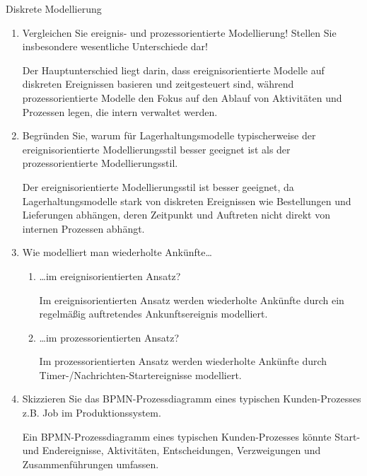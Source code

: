 \documentclass{article}
\begin{document}
\begin{exercise}{Diskrete Modellierung}
\begin{enumerate}
    \item Vergleichen Sie ereignis- und prozessorientierte Modellierung! Stellen Sie insbesondere wesentliche Unterschiede dar!
          \begin{solution}
            Der Hauptunterschied liegt darin, dass ereignisorientierte Modelle auf diskreten Ereignissen basieren und zeitgesteuert sind, während prozessorientierte Modelle den Fokus auf den Ablauf von Aktivitäten und Prozessen legen, die intern verwaltet werden.
          \end{solution}

    \item Begründen Sie, warum für Lagerhaltungsmodelle typischerweise der ereignisorientierte Modellierungsstil besser geeignet ist als der prozessorientierte Modellierungsstil.
          \begin{solution}
            Der ereignisorientierte Modellierungsstil ist besser geeignet, da Lagerhaltungsmodelle stark von diskreten Ereignissen wie Bestellungen und Lieferungen abhängen, deren Zeitpunkt und Auftreten nicht direkt von internen Prozessen abhängt.
          \end{solution}

    \item Wie modelliert man wiederholte Ankünfte…
          \begin{enumerate}
            \item …im ereignisorientierten Ansatz?
                  \begin{solution}
                    Im ereignisorientierten Ansatz werden wiederholte Ankünfte durch ein regelmäßig auftretendes Ankunftsereignis modelliert.
                  \end{solution}

            \item …im prozessorientierten Ansatz?
                  \begin{solution}
                    Im prozessorientierten Ansatz werden wiederholte Ankünfte durch Timer-/Nachrichten-Startereignisse modelliert.
                  \end{solution}
          \end{enumerate}

    \item Skizzieren Sie das BPMN-Prozessdiagramm eines typischen Kunden-Prozesses z.B. Job im Produktionssystem.
          \begin{solution}
            Ein BPMN-Prozessdiagramm eines typischen Kunden-Prozesses könnte Start- und Endereignisse, Aktivitäten, Entscheidungen, Verzweigungen und Zusammenführungen umfassen.
          \end{solution}


\end{enumerate}
\end{exercise}
\end{document}
